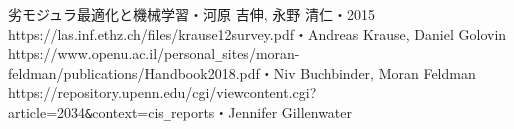 \documentclass[11pt, a4paper, dvipdfmx]{jsarticle}
\theoremstyle{definition}
\begin{document}




\begin{thebibliography}{10}
     劣モジュラ最適化と機械学習・河原 吉伸,  永野 清仁・2015
     https://las.inf.ethz.ch/files/krause12survey.pdf・Andreas Krause, Daniel Golovin
     https://www.openu.ac.il/personal\verb|_|sites/moran-feldman/publications/Handbook2018.pdf・Niv Buchbinder, Moran Feldman
     https://repository.upenn.edu/cgi/viewcontent.cgi?article=2034\verb|&|context=cis\verb|_|reports・Jennifer Gillenwater
  \end{thebibliography}
\end{document}
